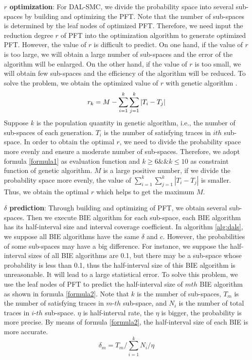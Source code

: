 \textbf{$r$ optimization}: For DAL-SMC, we divide the probability space into several sub-spaces by building and optimizing the PFT. Note that the number of sub-spaces is determined by the leaf nodes of optimized PFT. Therefore, we need input the reduction degree $r$ of PFT into the optimization algorithm to generate optimized PFT. However, the value of $r$ is difficult to predict. On one hand, if the value of $r$ is too large, we will obtain a large number of sub-spaces and the error of the algorithm will be enlarged. On the other hand, if the value of $r$ is too small, we will obtain few sub-spaces and the efficiency of the algorithm will be reduced. To solve the problem, we obtain the optimized value of $r$ with genetic algorithm \cite{DBLP:books/daglib/0019871}. 
\begin{equation}
\centering
\label{formula1}
r_k = M - \sum\limits_{i=1}^k \sum\limits_{j=1}^k |T_i - T_j| 
\end{equation}
Suppose $k$ is the population quantity in genetic algorithm, i.e., the number of sub-spaces of each generation. $T_i$ is the number of satisfying traces in $ith$ sub-space. In order to obtain the optimal $r$, we need to divide the probability space more evenly and ensure a moderate number of sub-spaces. Therefore, we adopt formula \ref{formula1} as evaluation function and $k \geq 6 \&\& k \leq 10$ as constraint function of genetic algorithm. $M$ is a large positive number, if we divide the probability space more evenly, the value of $\sum\limits_{i=1}^k \sum\limits_{j=1}^k |T_i - T_j|$ is smaller. Thus, we obtain the optimal $r$ which helps to get the maximum $M$. 

\textbf{$\delta$ prediction}:
Through building and optimizing of PFT, we obtain several sub-spaces. Then we execute BIE algorithm for each sub-space, each BIE algorithm has its half-interval size and interval coverage coefficient. In algorithm \ref{alg:dals}, we suppose all BIE algorithms have the same $\delta$ and $c$. However, the probabilities of some sub-spaces may have a big difference. For instance, we suppose the half-interval sizes of all BIE algorithms are 0.1, but there may be a sub-space whose probability is less than 0.1, thus the half-interval size of this BIE algorithm is unreasonable. It will lead to a large statistical error. To solve this problem, we use the leaf nodes of PFT to predict the half-interval size of $mth$ BIE algorithm as shown in formula \ref{formula2}. Note that $k$ is the number of sub-spaces, $T_m$ is the number of satisfying traces in $m$-$th$ sub-space, and $N_i$ is the number of total traces in $i$-$th$ sub-space. $\eta$ is half-interval rate, the $\eta$ is bigger, the probability is more precise. By means of formula \ref{formula2}, the half-interval size of each BIE is more accurate.
\begin{equation}
\label{formula2}
\delta_m = T_m / \sum\limits_{i=1}^k N_i / \eta
\end{equation}
